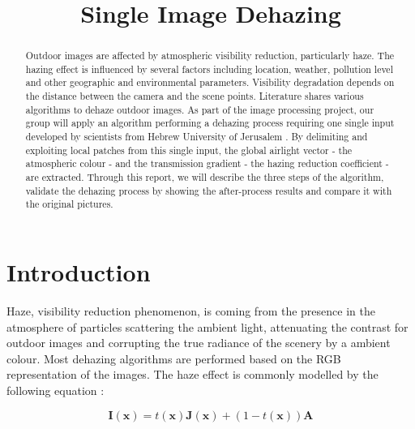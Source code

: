 \documentclass[conference]{IEEEtran}
\begin{document}
\title{Single Image Dehazing}

\author{
\and
{}
\and
{}
}

\maketitle

\begin{abstract}
Outdoor images are affected by atmospheric visibility reduction, particularly haze. The hazing effect is influenced by several 
factors including location, weather, pollution level and other geographic and environmental parameters. Visibility degradation depends on the distance between the camera and the scene points. Literature shares various algorithms to dehaze outdoor 
images.  As part of the image processing project, our group will apply an algorithm performing a dehazing process requiring
one single input developed by scientists from Hebrew University of Jerusalem \cite{airlight} \cite{dehaze}. By delimiting and exploiting local patches from this single input, the global airlight vector - the atmospheric
colour - and the transmission gradient - the hazing reduction coefficient - are extracted.  Through this report, we will describe 
the three steps of the algorithm, validate the dehazing process by showing the after-process results and compare it with the 
original pictures.  
\end{abstract}

\section{Introduction}

Haze, visibility reduction phenomenon, is coming from the presence in the atmosphere of particles scattering the ambient 
light, attenuating the contrast for outdoor images and corrupting the true radiance of the scenery by a ambient colour.
Most dehazing algorithms are performed based on the RGB representation of the images.
The haze effect is commonly modelled by the following equation \cite{airlight}:

\begin{equation}
\label{image_model}
\mathbf{I}(\mathbf{x}) = t(\mathbf{x}) \mathbf{J}(\mathbf{x}) + (1-t(\mathbf{x})) \mathbf{A}
\end{equation}
\end{document}
